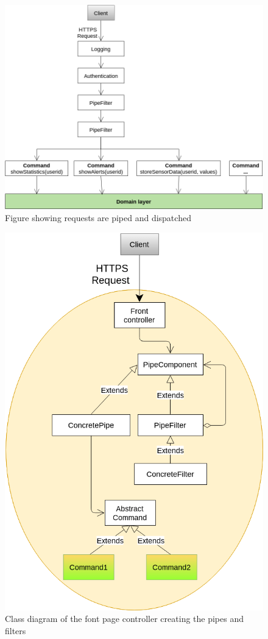 \begin{figure}[H]
\centering
\includegraphics[width=0.8\linewidth]{7-software/images/FrontFlow.png}
\caption{Figure showing requests are piped and dispatched}
\label{fig:frontflow}
\end{figure}

\begin{figure}[H]
\centering
\includegraphics[width=0.8\linewidth]{7-software/images/FrontClasses.png}
\caption{Class diagram of the font page controller creating the pipes and filters}
\label{fig:frontclasses}
\end{figure}


